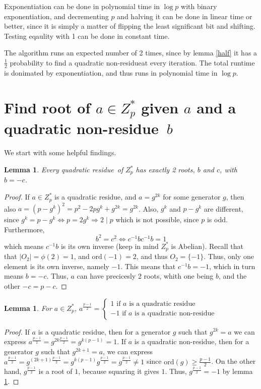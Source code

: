 \documentclass{article}
\newcommand{\z}{Z^*_p}
\newcommand{\ord}{\text{ord}}
\newcommand{\qr}{{quadratic residue}}
\newcommand{\qnr}{{quadratic non-residue}}
\newtheorem{lemma}[theorem]{Lemma}
\begin{document}
Exponentiation can be done in polynomial time in $\log p$ with binary
exponentiation, and decrementing $p$ and halving it can be done in linear time
or better, since it is simply a matter of flipping the least significant bit and
shifting. Testing eqaulity with 1 can be done in constant time.

The algorithm runs an expected number of 2 times, since by lemma \ref{half} it
has a $\frac{1}{2}$ probability to find a \qnr at every iteration. The total
runtime is donimated by exponentiation, and thus runs in polynomial time in
$\log p$.

\section{Find root of $a \in \z$ given $a$ and a \qnr~$b$}

We start with some helpful findings. 

\begin{lemma}\label{2roots}
  Every \qr~of $\z$ has exactly 2 roots, $b$ and $c$, with $b = -c$.
\end{lemma}

\begin{proof}
  If $a \in \z$ is a \qr, and $a = g^{2k}$ for some generator $g$, then also $a
  = (p-g^k)^2 = p^2 - 2pg^k + g^{2k} = g^{2k}$. Also, $g^k$ and $p - g^k$ are
  different, since $g^k = p - g^k \Leftrightarrow p = 2g^k \Rightarrow 2 \mid p$
  which is not possible, since $p$ is odd. Furthermore,
  $$b^2 = c^2 \Leftrightarrow c^{-1}bc^{-1}b = 1$$
  which means $c^{-1}b$ is its own inverse (keep in mind $\z$ is Abelian).
  Recall that that $|O_2| = \phi(2) = 1$, and $\ord(-1) = 2$, and thus $O_2 =
  \{-1\}$. Thus, only one element is its own inverse, namely $-1$. This means
  that $c^{-1}b = -1$, which in turn means $b=-c$. Thus, $a$ can have
  precicesly 2 roots, whith one being $b$, and the other $-c = p - c$.
\end{proof}

\begin{lemma}\label{plusminus}
  For $a \in \z$, $a^{\frac{p-1}{2}}= \begin{cases}1 \text{ if } a \text{ is a
      \qr } \\ -1 \text { if } a \text{ is a \qnr}\end{cases}$
\end{lemma}
\begin{proof}
  If $a$ is a \qr, then for a generator $g$ such that $g^{2k}=a$ we can express
  $a^{\frac{p-1}{2}} = g^{2k\frac{p-1}{2}} = g^{k(p-1)} = 1$. If $a$ is a \qnr,
  then for a generator $g$ such that $g^{2k + 1} = a$, we can express
  $a^{\frac{p-1}{2}} = g^{(2k+1)\frac{p-1}{2}} = g^{k(p-1)}g^{\frac{p-1}{2}}=
  g^{\frac{p-1}{2}} \not = 1$ since $\ord(g) \geq \frac{p-1}{2}$. On the other
  hand, $g^{\frac{p-1}{2}}$ is a root of $1$, because squaring it gives $1$.
  Thus, $g^{\frac{p-1}{2}} = -1$ by lemma \ref{2roots}.
\end{proof}
\end{document}

